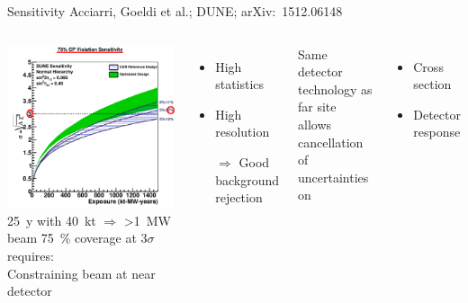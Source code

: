 \documentclass[]{beamer}
\newcommand*{\emphcol}{red}
\newcommand*{\dune}{{DUNE}}
\begin{document}
\begin{frame}{Sensitivity}{}
	{\tiny Acciarri, Goeldi et al.; \dune{}; arXiv:~1512.06148~\cite{dune2}}
	\begin{columns}[c]
		\centering
		\includegraphics[width=\textwidth]{defence/cpv75_exp_syst}\\
		\SI{25}{y} with \SI{40}{\kilo\tonne} {\color{\emphcol} $\Rightarrow$ \SI{>1}{\mega\watt} beam}
		\SI{75}{\percent} coverage at $\num{3}\sigma$ requires:\\
		{\color{\emphcol} Constraining beam at near detector}
		\begin{itemize}
			\item High statistics
			\item High resolution
			\item[$\Rightarrow$] Good background rejection
		\end{itemize}
		Same detector technology as far site allows cancellation of uncertainties on
		\begin{itemize}
			\item Cross section
			\item Detector response
		\end{itemize}
	\end{columns}
\end{frame}
\end{document}
